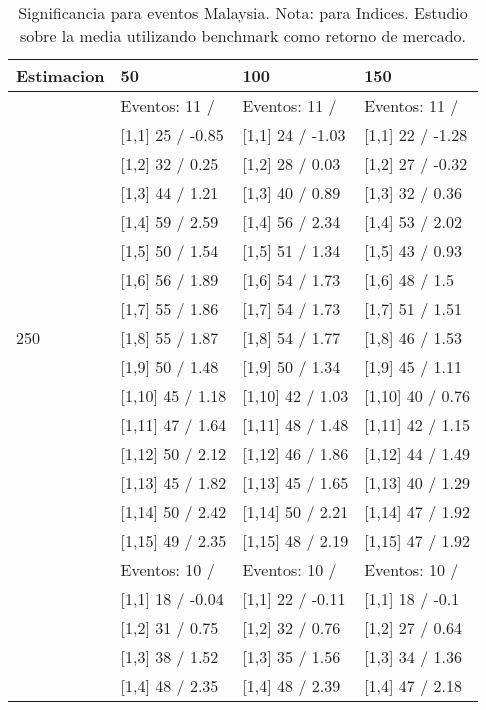\begin{table}

\caption{Significancia para eventos Malaysia. Nota: para Indices. Estudio sobre la media utilizando benchmark como retorno de mercado.}
\centering
\begin{tabular}[t]{llll}
\toprule
Estimacion & 50 & 100 & 150\\
\midrule
 & Eventos:  11 / & Eventos:  11 / & Eventos:  11 /\\
 & {}[1,1] 25  / -0.85 & {}[1,1] 24  / -1.03 & {}[1,1] 22  / -1.28\\
 & {}[1,2] 32  / 0.25 & {}[1,2] 28  / 0.03 & {}[1,2] 27  / -0.32\\
 & {}[1,3] 44  / 1.21 & {}[1,3] 40  / 0.89 & {}[1,3] 32  / 0.36\\
 & {}[1,4] 59  / 2.59 & {}[1,4] 56  / 2.34 & {}[1,4] 53  / 2.02\\
\addlinespace
 & {}[1,5] 50  / 1.54 & {}[1,5] 51  / 1.34 & {}[1,5] 43  / 0.93\\
 & {}[1,6] 56  / 1.89 & {}[1,6] 54  / 1.73 & {}[1,6] 48  / 1.5\\
 & {}[1,7] 55  / 1.86 & {}[1,7] 54  / 1.73 & {}[1,7] 51  / 1.51\\
250 & {}[1,8] 55  / 1.87 & {}[1,8] 54  / 1.77 & {}[1,8] 46  / 1.53\\
 & {}[1,9] 50  / 1.48 & {}[1,9] 50  / 1.34 & {}[1,9] 45  / 1.11\\
\addlinespace
 & {}[1,10] 45  / 1.18 & {}[1,10] 42  / 1.03 & {}[1,10] 40  / 0.76\\
 & {}[1,11] 47  / 1.64 & {}[1,11] 48  / 1.48 & {}[1,11] 42  / 1.15\\
 & {}[1,12] 50  / 2.12 & {}[1,12] 46  / 1.86 & {}[1,12] 44  / 1.49\\
 & {}[1,13] 45  / 1.82 & {}[1,13] 45  / 1.65 & {}[1,13] 40  / 1.29\\
 & {}[1,14] 50  / 2.42 & {}[1,14] 50  / 2.21 & {}[1,14] 47  / 1.92\\
\addlinespace
 & {}[1,15] 49  / 2.35 & {}[1,15] 48  / 2.19 & {}[1,15] 47  / 1.92\\
 & Eventos:  10 / & Eventos:  10 / & Eventos:  10 /\\
 & {}[1,1] 18  / -0.04 & {}[1,1] 22  / -0.11 & {}[1,1] 18  / -0.1\\
 & {}[1,2] 31  / 0.75 & {}[1,2] 32  / 0.76 & {}[1,2] 27  / 0.64\\
 & {}[1,3] 38  / 1.52 & {}[1,3] 35  / 1.56 & {}[1,3] 34  / 1.36\\
\addlinespace
 & {}[1,4] 48  / 2.35 & {}[1,4] 48  / 2.39 & {}[1,4] 47  / 2.18\\

\end{tabular}
\end{table}
